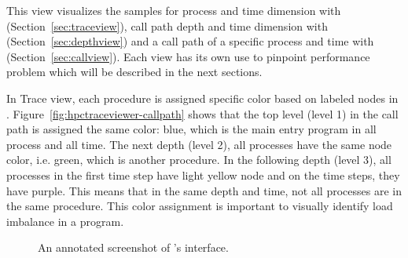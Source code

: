 This view visualizes the samples for process and time dimension with \emph{\traceview} (Section~\ref{sec:traceview}), call path depth and time dimension with \emph{\depthview} (Section~\ref{sec:depthview}) and a call path of a specific process and time with \emph{\callview} (Section~\ref{sec:callview}).
Each view has its own use to pinpoint performance problem which will be described in the next sections.

In Trace view, each procedure is assigned specific color based on labeled nodes in \hpcviewer. Figure~\ref{fig:hpctraceviewer-callpath} shows that the top level (level 1) in the call path is assigned the same color: blue, which is the main entry program in all process and all time.
The next depth (level 2), all processes have the same node color, i.e. green, which is another procedure. 
In the following depth (level 3), all processes in the first time step have light yellow node and on the time steps, they have purple. This means that in the same depth and time, not all processes are in the same procedure.
This color assignment is important to visually identify load imbalance in a program.




\begin{figure}[t]
\caption{An annotated screenshot of \hpctraceviewer{}'s interface.}
\label{fig:hpctraceviewer-legend}
\end{figure}

